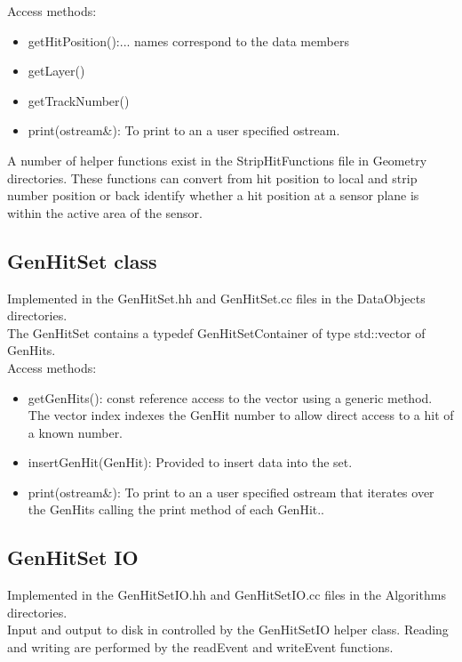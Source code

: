 \documentclass[aps,prd,superscriptaddress,floatfix]{revtex4}
\begin{document}
Access methods:
\begin{itemize}
\item getHitPosition():... names correspond to the data members
\item getLayer()
\item getTrackNumber()
\item print(ostream\&): To print to an a user specified ostream.
\end{itemize}

A number of helper functions exist in the StripHitFunctions file in Geometry directories.  These functions
can convert from hit position to local and strip number position or back identify whether a hit position at a sensor
plane is within the active area of the sensor.


\subsection{GenHitSet class}
Implemented in the GenHitSet.hh and GenHitSet.cc files in the DataObjects directories.
\\

The GenHitSet contains a typedef GenHitSetContainer of type std::vector of GenHits.
\\

Access methods:

\begin{itemize}
\item getGenHits(): const reference access to the vector using a generic method.
The vector index indexes the GenHit number to allow direct access to a hit of a known number.

\item insertGenHit(GenHit): Provided to insert data into the set.

\item print(ostream\&): To print to an a user specified ostream that iterates over
the GenHits calling the print method of each GenHit..
\end{itemize}

\subsection{GenHitSet IO}
Implemented in the GenHitSetIO.hh and GenHitSetIO.cc files in the Algorithms directories.
\\

Input and output to disk in controlled by the GenHitSetIO helper class.  Reading and writing
are performed by the readEvent and writeEvent functions.
\\
\end{document}
